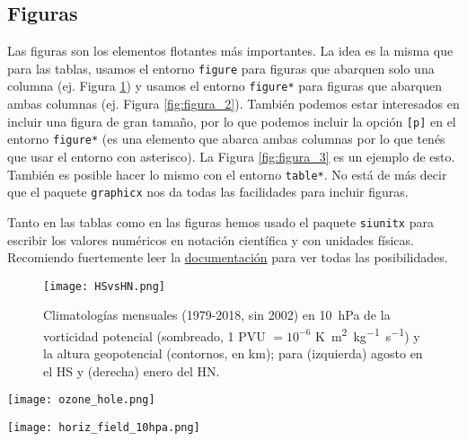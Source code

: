 \documentclass[a4paper,10pt,twocolumn,twoside]{article}
\begin{document}
\subsection{Figuras}
Las figuras son los elementos flotantes más importantes. La idea es la misma que para las tablas, usamos el entorno \texttt{figure} para figuras que abarquen solo una columna (ej. Figura \ref{fig:figura_1}) y usamos el entorno \texttt{figure*} para figuras que abarquen ambas columnas (ej. Figura \ref{fig:figura_2}). También podemos estar interesados en incluir una figura de gran tamaño, por lo que podemos incluir la opción \texttt{[p]} en el entorno \texttt{figure*} (es una elemento que abarca ambas columnas por lo que tenés que usar el entorno con asterisco). La Figura \ref{fig:figura_3} es un ejemplo de esto. También es posible hacer lo mismo con el entorno \texttt{table*}. No está de más decir que el paquete \texttt{graphicx} nos da todas las facilidades para incluir figuras.

Tanto en las tablas como en las figuras hemos usado el paquete \texttt{siunitx} para escribir los valores numéricos en notación científica y con unidades físicas. Recomiendo fuertemente leer la \href{https://ctan.dcc.uchile.cl/macros/latex/contrib/siunitx/siunitx.pdf}{documentación} para ver todas las posibilidades.

\begin{figure}[b]
    \centering
    \texttt{[image: HSvsHN.png]}
    \caption{Climatologías mensuales (1979-2018, sin 2002) en \SI{10}{\hecto\Pa} de la vorticidad potencial (sombreado, 1 PVU $= 10^{-6}$ \si{K.m^2.kg^{-1}.s^{-1}}) y la altura geopotencial (contornos, en \si{\km}); para (izquierda) agosto en el HS y (derecha) enero del HN.}
    \label{fig:figura_1}
\end{figure}

\begin{figure*}[t]
    \centering
    \texttt{[image: ozone\_hole.png]}
    \caption{Promedios diarios de la columna total de ozono en unidades Dobson para los días indicados. La isolínea de 220 UD se muestra en celeste punteado.}
    \label{fig:figura_2}
\end{figure*}

\begin{figure*}[p]
    \centering
    \texttt{[image: horiz\_field\_10hpa.png]}
    \caption{Series de campos horizontales en \SI{10}{\hecto\Pa} de $q$ (sombreado), $Z$ (contornos negros, cada \SI{500}{\meter}) y anomalía de $T$ (contornos coloreados, cada \SI{10}{\degreeCelsius}), en días seleccionados de agosto, septiembre y octubre del 2002 (1ra y 2da columna) y del 2019 (3ra y 4ta columna). Se muestra el valor de la isohipsa de \SI{29,5}{\km}. La isoterma de \SI{0}{\degreeCelsius} se muestra como una línea blanca gruesa.}
    \label{fig:figura_3}
\end{figure*}
\end{document}
